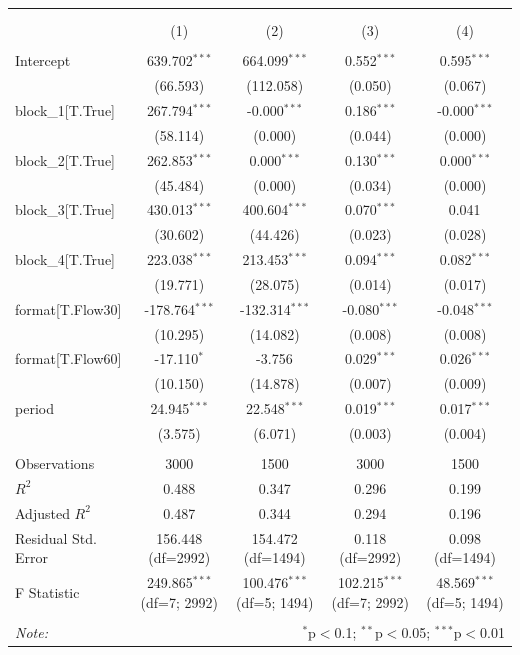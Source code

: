 \begin{table}[!htbp] \centering
\begin{tabular}{@{\extracolsep{5pt}}lcccc}
\\[-1.8ex]\hline
\hline \\[-1.8ex]
\\[-1.8ex] & (1) & (2) & (3) & (4) \\
\hline \\[-1.8ex]
 Intercept & 639.702$^{***}$ & 664.099$^{***}$ & 0.552$^{***}$ & 0.595$^{***}$ \\
& (66.593) & (112.058) & (0.050) & (0.067) \\
 block_1[T.True] & 267.794$^{***}$ & -0.000$^{***}$ & 0.186$^{***}$ & -0.000$^{***}$ \\
& (58.114) & (0.000) & (0.044) & (0.000) \\
 block_2[T.True] & 262.853$^{***}$ & 0.000$^{***}$ & 0.130$^{***}$ & 0.000$^{***}$ \\
& (45.484) & (0.000) & (0.034) & (0.000) \\
 block_3[T.True] & 430.013$^{***}$ & 400.604$^{***}$ & 0.070$^{***}$ & 0.041$^{}$ \\
& (30.602) & (44.426) & (0.023) & (0.028) \\
 block_4[T.True] & 223.038$^{***}$ & 213.453$^{***}$ & 0.094$^{***}$ & 0.082$^{***}$ \\
& (19.771) & (28.075) & (0.014) & (0.017) \\
 format[T.Flow30] & -178.764$^{***}$ & -132.314$^{***}$ & -0.080$^{***}$ & -0.048$^{***}$ \\
& (10.295) & (14.082) & (0.008) & (0.008) \\
 format[T.Flow60] & -17.110$^{*}$ & -3.756$^{}$ & 0.029$^{***}$ & 0.026$^{***}$ \\
& (10.150) & (14.878) & (0.007) & (0.009) \\
 period & 24.945$^{***}$ & 22.548$^{***}$ & 0.019$^{***}$ & 0.017$^{***}$ \\
& (3.575) & (6.071) & (0.003) & (0.004) \\
\hline \\[-1.8ex]
 Observations & 3000 & 1500 & 3000 & 1500 \\
 $R^2$ & 0.488 & 0.347 & 0.296 & 0.199 \\
 Adjusted $R^2$ & 0.487 & 0.344 & 0.294 & 0.196 \\
 Residual Std. Error & 156.448 (df=2992) & 154.472 (df=1494) & 0.118 (df=2992) & 0.098 (df=1494) \\
 F Statistic & 249.865$^{***}$ (df=7; 2992) & 100.476$^{***}$ (df=5; 1494) & 102.215$^{***}$ (df=7; 2992) & 48.569$^{***}$ (df=5; 1494) \\
\hline
\hline \\[-1.8ex]
\textit{Note:} & \multicolumn{4}{r}{$^{*}$p$<$0.1; $^{**}$p$<$0.05; $^{***}$p$<$0.01} \\
\end{tabular}
\end{table}
